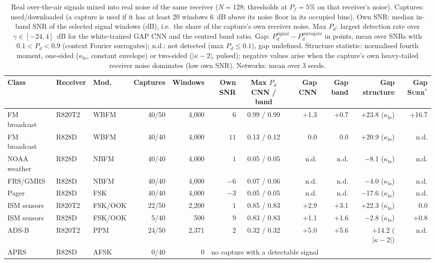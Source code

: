 \begin{table}[t]
\centering
\caption{Real over-the-air signals mixed into real noise of the same receiver ($N=128$; thresholds at $P_f=5\%$ on that receiver's noise). Captures: used/downloaded (a capture is used if it has at least 20 windows 6~dB above its noise floor in its occupied bins). Own SNR: median in-band SNR of the selected signal windows (dB), i.e.\ the share of the capture's own receiver noise. Max $P_d$: largest detection rate over $\gamma\in[-24,4]$~dB for the white-trained GAP CNN and the centred band ratio. Gap: $P_d^{\mathrm{signal}}-P_d^{\mathrm{surrogate}}$ in points, mean over SNRs with $0.1<P_d<0.9$ (context Fourier surrogates); n.d.: not detected (max $P_d\le0.1$), gap undefined. Structure statistic: normalised fourth moment, one-sided ($\kappa_{\mathrm{lo}}$, constant envelope) or two-sided ($|\kappa-2|$, pulsed); negative values arise when the capture's own heavy-tailed receiver noise dominates (low own SNR). Networks: mean over 3 seeds.}
\label{tab:realsig}
\footnotesize
\setlength{\tabcolsep}{3pt}
\begin{tabular}{lllrrrcrrrr}
\toprule
Class & Receiver & Mod. & Captures & Windows & Own SNR & Max $P_d$ CNN / band & Gap CNN & Gap band & Gap structure & Gap \textsc{Surr}$^{\ast}$ \\
\midrule
FM broadcast & R820T2 & WBFM & 40/50 & 4,000 & $6$ & 0.99 / 0.99 & $+$1.3 & $+$0.7 & $+$23.8 ($\kappa_{\mathrm{lo}}$) & $+$16.7 \\
FM broadcast & R828D & WBFM & 40/40 & 4,000 & $11$ & 0.13 / 0.12 & 0.0 & 0.0 & $+$20.9 ($\kappa_{\mathrm{lo}}$) & n.d. \\
NOAA weather & R828D & NBFM & 40/40 & 4,000 & $1$ & 0.05 / 0.05 & n.d. & n.d. & $-$8.1 ($\kappa_{\mathrm{lo}}$) & n.d. \\
FRS/GMRS & R828D & NBFM & 40/40 & 4,000 & $-6$ & 0.07 / 0.06 & n.d. & n.d. & $-$4.0 ($\kappa_{\mathrm{lo}}$) & n.d. \\
Pager & R828D & FSK & 40/40 & 4,000 & $-3$ & 0.05 / 0.05 & n.d. & n.d. & $-$17.6 ($\kappa_{\mathrm{lo}}$) & n.d. \\
ISM sensors & R820T2 & FSK/OOK & 22/50 & 2,200 & $1$ & 0.85 / 0.83 & $+$2.9 & $+$3.1 & $+$22.3 ($\kappa_{\mathrm{lo}}$) & 0.0 \\
ISM sensors & R828D & FSK/OOK & 5/40 & 500 & $9$ & 0.83 / 0.83 & $+$1.1 & $+$1.6 & $-$2.8 ($\kappa_{\mathrm{lo}}$) & $+$0.8 \\
ADS-B & R820T2 & PPM & 24/50 & 2,371 & $2$ & 0.32 / 0.32 & $+$5.0 & $+$5.6 & $+$14.2 ($|\kappa-2|$) & n.d. \\
APRS & R828D & AFSK & 0/40 & 0 & \multicolumn{6}{l}{no capture with a detectable signal} \\
\bottomrule
\end{tabular}
\end{table}
